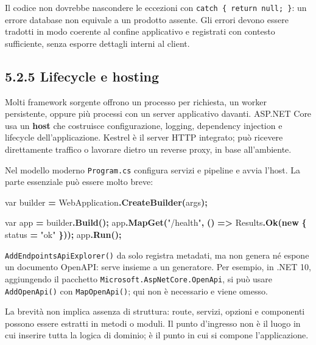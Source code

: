 \documentclass[
  italian,
  10pt,
]{book}
\newenvironment{Shaded}{\begin{snugshade}}{\end{snugshade}}
\newcommand{\DataTypeTok}[1]{\textcolor[rgb]{0.13,0.29,0.53}{#1}}
\newcommand{\FunctionTok}[1]{\textcolor[rgb]{0.13,0.29,0.53}{\textbf{#1}}}
\newcommand{\KeywordTok}[1]{\textcolor[rgb]{0.13,0.29,0.53}{\textbf{#1}}}
\newcommand{\NormalTok}[1]{#1}
\newcommand{\OperatorTok}[1]{\textcolor[rgb]{0.81,0.36,0.00}{\textbf{#1}}}
\newcommand{\StringTok}[1]{\textcolor[rgb]{0.31,0.60,0.02}{#1}}
\begin{document}
Il codice non dovrebbe nascondere le eccezioni con
\texttt{catch\ \{\ return\ null;\ \}}: un errore database non equivale a
un prodotto assente. Gli errori devono essere tradotti in modo coerente
al confine applicativo e registrati con contesto sufficiente, senza
esporre dettagli interni al client.

\subsection{5.2.5 Lifecycle e hosting}\label{lifecycle-e-hosting}

Molti framework sorgente offrono un processo per richiesta, un worker
persistente, oppure più processi con un server applicativo davanti.
ASP.NET Core usa un \textbf{host} che costruisce configurazione,
logging, dependency injection e lifecycle dell'applicazione. Kestrel è
il server HTTP integrato; può ricevere direttamente traffico o lavorare
dietro un reverse proxy, in base all'ambiente.

Nel modello moderno \texttt{Program.cs} configura servizi e pipeline e
avvia l'host. La parte essenziale può essere molto breve:

\begin{Shaded}
\begin{Highlighting}[]
\DataTypeTok{var}\NormalTok{ builder }\OperatorTok{=}\NormalTok{ WebApplication}\OperatorTok{.}\FunctionTok{CreateBuilder}\OperatorTok{(}\NormalTok{args}\OperatorTok{);}

\DataTypeTok{var}\NormalTok{ app }\OperatorTok{=}\NormalTok{ builder}\OperatorTok{.}\FunctionTok{Build}\OperatorTok{();}
\NormalTok{app}\OperatorTok{.}\FunctionTok{MapGet}\OperatorTok{(}\StringTok{"/health"}\OperatorTok{,} \OperatorTok{()} \OperatorTok{=\textgreater{}}\NormalTok{ Results}\OperatorTok{.}\FunctionTok{Ok}\OperatorTok{(}\KeywordTok{new} \OperatorTok{\{}\NormalTok{ status }\OperatorTok{=} \StringTok{"ok"} \OperatorTok{\}));}
\NormalTok{app}\OperatorTok{.}\FunctionTok{Run}\OperatorTok{();}
\end{Highlighting}
\end{Shaded}

\texttt{AddEndpointsApiExplorer()} da solo registra metadati, ma non
genera né espone un documento OpenAPI: serve insieme a un generatore.
Per esempio, in .NET 10, aggiungendo il pacchetto
\texttt{Microsoft.AspNetCore.OpenApi}, si può usare
\texttt{AddOpenApi()} con \texttt{MapOpenApi()}; qui non è necessario e
viene omesso.

La brevità non implica assenza di struttura: route, servizi, opzioni e
componenti possono essere estratti in metodi o moduli. Il punto
d'ingresso non è il luogo in cui inserire tutta la logica di dominio; è
il punto in cui si compone l'applicazione.
\end{document}
